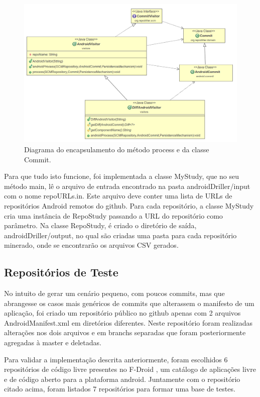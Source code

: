 \documentclass[a4paper,12pt]{article}
\begin{document}
\begin{figure}[h]
\centering
\includegraphics[width=\linewidth]{imgs/diagram.png}
\caption{Diagrama do encapsulamento do método process e da classe Commit.}
\label{fig:diagram}
\end{figure}


Para que tudo isto funcione, foi implementada a classe MyStudy, que no seu método main,  lê o arquivo de entrada encontrado na pasta androidDriller/input com o nome repoURLs.in. Este arquivo deve conter uma lista de URLs de repositórios Android remotos do github. Para cada repositório, a classe MyStudy cria uma instância de RepoStudy passando a URL do repositório como parâmetro. Na classe RepoStudy, é criado o diretório de saída, androidDriller/output, no qual são criadas uma pasta para cada repositório minerado,  onde se encontrarão os arquivos CSV gerados. 


\subsection{Repositórios de Teste}%
\label{sec:repoteste}

No intuito de gerar um cenário pequeno, com poucos commits, mas que abrangesse os casos mais genéricos de commits que alterassem o manifesto de um aplicação, foi criado um repositório público no github apenas com 2 arquivos AndroidManifest.xml em diretórios diferentes. Neste repositório foram realizadas alterações nos dois arquivos e em branchs separadas que foram posteriormente agregadas à master e deletadas.

Para validar a implementação descrita anteriormente, foram escolhidos 6 repositórios de código livre presentes no F-Droid \cite{fdroid}, um catálogo de aplicações livre e de código aberto para a plataforma android. Juntamente com o repositório citado acima, foram listados 7 repositórios para formar uma base de testes.
\end{document}
